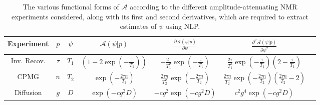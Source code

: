 \begin{table}
    \begin{center}
        \begin{tabular}{ccccccc}
            \hline
            Experiment &
            $p$ &
            $\psi$ &
            $\mathcal{A}(\psi | p)$ &
            $\frac{\partial \mathcal{A}(\psi | p)}{\partial \psi}$ &
            $\frac{\partial^2 \mathcal{A}(\psi | p)}{\partial \psi^2}$ \\ \hline
            Inv. Recov.&
            $\tau$ &
            $T_1$ &
            $\left(1 - 2 \exp \left(-\frac{\tau}{T_{1}}\right)\right)$ &
            $-\frac{2 \tau}{T_1^2} \exp\left(-\frac{\tau}{T_1}\right)$ &
            $\frac{2 \tau}{T_1^3} \exp\left(-\frac{\tau}{T_1}\right)\left(2 - \frac{\tau}{T_1}\right)$\\
            \acs{CPMG} &
            $n$ &
            $T_2$ &
            $\exp\left(-\frac{2 \tau n}{T_2}\right)$ &
            $\frac{2 \tau n}{T_2^2}\exp\left(-\frac{2 \tau n}{T_2}\right)$ &
            $\frac{2 \tau n}{T_2^3}\exp\left(-\frac{2 \tau n}{T_2}\right)
            \left( \frac{2 \tau n}{T_2} - 2 \right)$ \\
            Diffusion &
            $g$ &
            $D$ &
            $\exp\left(-c g^2 D\right)$ &
            $-c g^2 \exp\left(-c g^2 D\right)$ &
            $c^2 g^4 \exp\left(-c g^2 D\right)$ \\
            \hline
       \end{tabular}
       \caption[
           The various functional forms of $\mathcal{A}$ according to the
           different amplitude-attenuating NMR experiments considered.
       ]
       {
           The various functional forms of $\mathcal{A}$ according to the
           different amplitude-attenuating NMR experiments considered, along
           with its first and second derivatives, which are required to extract
           estimates of $\psi$ using \ac{NLP}.
       }
       \label{tab:seq-equations}
    \end{center}
\end{table}

